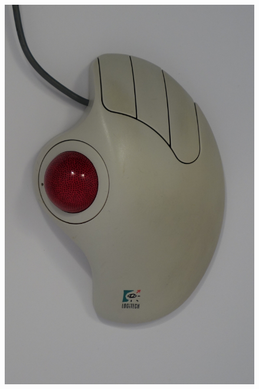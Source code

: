 \documentclass[11pt, a4paper]{article}
\begin{document}
\begin{figure}[h]
    \centering
    \includegraphics[scale=0.5]{1995_logitech_trackman/2.16.JPG}

\end{figure}
\end{document}
